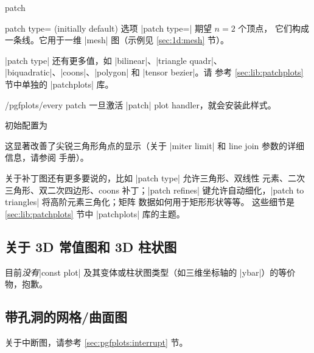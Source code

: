 {\begin{plottype}[/pgfplots]{patch}
\begin{pgfplotskey}{patch type= (initially default)}
        选项 |patch type=| 期望 $n=2$ 个顶点，
        它们构成一条线。它用于一维 |mesh| 图（示例见
        \ref{sec:1d:mesh} 节）。

        |patch type| 还有更多值，如 |bilinear|、|triangle quadr|、
        |biquadratic|、|coons|、|polygon| 和 |tensor bezier|。请
        参考 \ref{sec:lib:patchplots} 节中单独的 |patchplots| 库。
    \end{pgfplotskey}

    \begin{stylekey}{/pgfplots/every patch}
        一旦激活 |patch| plot handler，就会安装此样式。

        初始配置为
\begin{codeexample}
\end{codeexample}
        \noindent 这显著改善了尖锐三角形角点的显示（关于 |miter limit|
        和 line join 参数的详细信息，请参阅 \Tikz{} 手册）。
    \end{stylekey}

    关于补丁图还有更多要说的，比如 |patch type| 允许三角形、双线性
    元素、二次三角形、双二次四边形、coons 补丁；|patch refines|
    键允许自动细化，|patch to triangles| 将高阶元素三角化；矩阵
    数据如何用于矩形形状等等。
    这些细节是 \ref{sec:lib:patchplots} 节中 |patchplots| 库的主题。
\end{plottype}


\subsection{关于 3D 常值图和 3D 柱状图}

目前\emph{没有}|const plot| 及其变体或柱状图类型（如三维坐标轴的
|ybar|）的等价物，抱歉。


\subsection{带孔洞的网格/曲面图}

关于中断图，请参考 \ref{sec:pgfplots:interrupt} 节。

}
